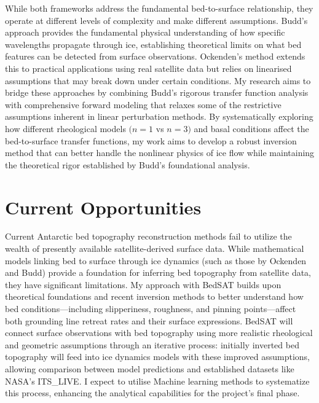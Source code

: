 While both frameworks address the fundamental bed-to-surface relationship, they operate at different levels of complexity and make different assumptions. Budd's approach provides the fundamental physical understanding of how specific wavelengths propagate through ice, establishing theoretical limits on what bed features can be detected from surface observations. Ockenden's method extends this to practical applications using real satellite data but relies on linearised assumptions that may break down under certain conditions. My research aims to bridge these approaches by combining Budd's rigorous transfer function analysis with comprehensive forward modeling that relaxes some of the restrictive assumptions inherent in linear perturbation methods. By systematically exploring how different rheological models $(n = 1$ vs $n = 3)$ and basal conditions affect the bed-to-surface transfer functions, my work aims to develop a robust inversion method that can better handle the nonlinear physics of ice flow while maintaining the theoretical rigor established by Budd's foundational analysis.

\section{Current Opportunities}

Current Antarctic bed topography reconstruction methods fail to utilize the wealth of presently available satellite-derived surface data. While mathematical models linking bed to surface through ice dynamics (such as those by Ockenden and Budd) provide a foundation for inferring bed topography from satellite data, they have significant limitations. My approach with BedSAT builds upon theoretical foundations and recent inversion methods to better understand how bed conditions—including slipperiness, roughness, and pinning points—affect both grounding line retreat rates and their surface expressions. BedSAT will connect surface observations with bed topography using more realistic rheological and geometric assumptions through an iterative process: initially inverted bed topography will feed into ice dynamics models with these improved assumptions, allowing comparison between model predictions and established datasets like NASA's ITS\_LIVE. I expect to utilise Machine learning methods to systematize this process, enhancing the analytical capabilities for the project's final phase.

